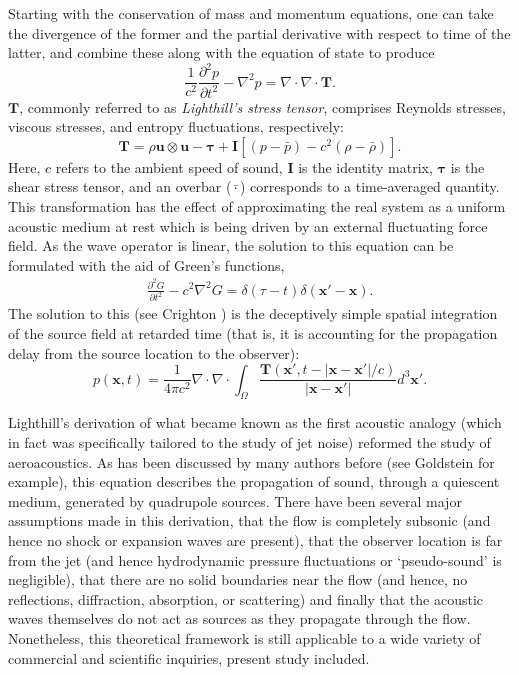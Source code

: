 Starting with the conservation of mass and momentum equations, one can take the divergence of the former and the partial derivative with respect to time of the latter, and combine these along with the equation of state to produce
\begin{equation}
\frac{1}{c^2}\frac{\partial^2 p}{\partial t^2} - \nabla^2 p = \nabla \cdot \nabla \cdot \mathbf{T}.
\label{eq:lighthill_analogy}
\end{equation}
$\mathbf{T}$, commonly referred to as \textit{Lighthill's stress tensor}, comprises Reynolds stresses, viscous stresses, and entropy fluctuations, respectively:
\begin{equation}
\mathbf{T} = \rho \mathbf{u} \otimes \mathbf{u} - \mathbf{\tau} + \mathbf{I} \left[ (p-\bar{p}) - c^2 (\rho - \bar{\rho}) \right].
\end{equation}
Here, $c$ refers to the ambient speed of sound, $\mathbf{I}$ is the identity matrix, $\mathbf{\tau}$ is the shear stress tensor, and an overbar ($\bar{\cdot}$) corresponds to a time-averaged quantity.
This transformation has the effect of approximating the real system as a uniform acoustic medium at rest which is being driven by an external fluctuating force field.
As the wave operator is linear, the solution to this equation can be formulated with the aid of Green's functions,
\begin{eqnarray}
\frac{\partial^2 G}{\partial t^2} - c^2 \nabla^2 G = \delta (\tau -t) \delta (\mathbf{x}' - \mathbf{x}).
\end{eqnarray}
The solution to this (see Crighton \etal \citep{Crighton1992}) is the deceptively simple spatial integration of the source field at retarded time (that is, it is accounting for the propagation delay from the source location to the observer):
\begin{equation}
p (\mathbf{x},t) = \frac{1}{4 \pi c^2} \nabla \cdot \nabla \cdot \int_{\Omega} \frac{\mathbf{T} (\mathbf{x}',t - |\mathbf{x} - \mathbf{x}'|/c)}{|\mathbf{x} - \mathbf{x}'|} d^3 \mathbf{x}'.
\label{eq:source_integration}
\end{equation}

Lighthill's derivation of what became known as the first acoustic analogy (which in fact was specifically tailored to the study of jet noise) reformed the study of aeroacoustics.
As has been discussed by many authors before (see Goldstein \citep{Goldstein1974} for example), this equation describes the propagation of sound, through a quiescent medium, generated by quadrupole sources. 
There have been several major assumptions made in this derivation, that the flow is completely subsonic (and hence no shock or expansion waves are present), that the observer location is far from the jet (and hence hydrodynamic pressure fluctuations or `pseudo-sound' is negligible), that there are no solid boundaries near the flow (and hence, no reflections, diffraction, absorption, or scattering) and finally that the acoustic waves themselves do not act as sources as they propagate through the flow.
Nonetheless, this theoretical framework is still applicable to a wide variety of commercial and scientific inquiries, present study included.


